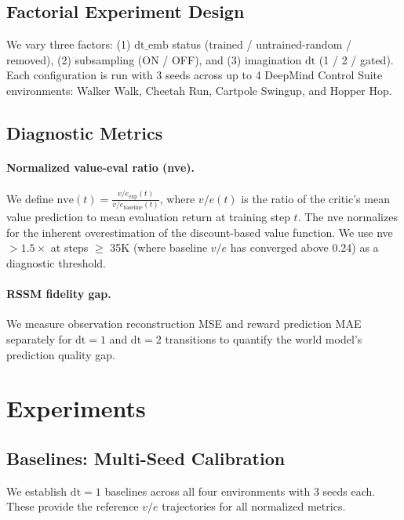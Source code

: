 \documentclass[10pt,letterpaper]{article}
\newcommand{\dt}{\mathrm{dt}}
\newcommand{\nve}{\mathrm{nve}}
\begin{document}
\subsection{Factorial Experiment Design}
We vary three factors: (1) $\dt\_\text{emb}$ status (trained / untrained-random / removed), (2) subsampling (ON / OFF), and (3) imagination $\dt$ (1 / 2 / gated).
Each configuration is run with 3 seeds across up to 4 DeepMind Control Suite environments: Walker Walk, Cheetah Run, Cartpole Swingup, and Hopper Hop.

\subsection{Diagnostic Metrics}
\paragraph{Normalized value-eval ratio (nve).}
We define $\nve(t) = \frac{v/e_{\text{exp}}(t)}{v/e_{\text{baseline}}(t)}$, where $v/e(t)$ is the ratio of the critic's mean value prediction to mean evaluation return at training step $t$.
The nve normalizes for the inherent overestimation of the discount-based value function.
We use nve $> 1.5\times$ at steps $\geq$ 35K (where baseline $v/e$ has converged above 0.24) as a diagnostic threshold.

\paragraph{RSSM fidelity gap.}
We measure observation reconstruction MSE and reward prediction MAE separately for $\dt=1$ and $\dt=2$ transitions to quantify the world model's prediction quality gap.

\section{Experiments}

\subsection{Baselines: Multi-Seed Calibration}
\label{sec:baselines}

We establish $\dt=1$ baselines across all four environments with 3 seeds each.
These provide the reference $v/e$ trajectories for all normalized metrics.
\end{document}
